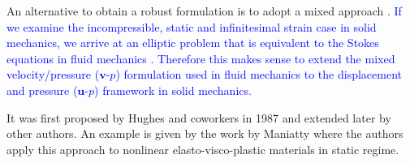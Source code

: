 \documentclass[11pt,english]{article}
\newcommand{\LM}[1]{\textcolor{blue}{#1}}
\begin{document}

An alternative to obtain a robust formulation is to adopt a mixed approach \cite{franca1988new}. 
\LM{If we examine the incompressible, static and infinitesimal strain case in solid mechanics, we arrive at an elliptic problem that is equivalent to the Stokes equations in fluid mechanics \cite{hughes1986new}. Therefore this makes sense to extend the mixed velocity/pressure ($\boldsymbol{v}$-$p$) formulation used in fluid mechanics to the displacement and pressure ($\boldsymbol{u}$-$p$) framework in solid mechanics. }

It was first proposed  by Hughes and coworkers in 1987 \cite{hughes1987new} and extended later by other authors. An example is given by the work by Maniatty \cite{maniatty2001stabilized} where the authors apply  this approach to  nonlinear elasto-visco-plastic materials in static regime. 
\end{document}
